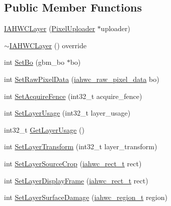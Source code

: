 \subsection*{Public Member Functions}
\begin{DoxyCompactItemize}
\item 
\mbox{\hyperlink{classhwcomposer_1_1IAHWC_1_1IAHWCLayer_ae122add62cc7f3cd678c50e496d4c47a}{I\+A\+H\+W\+C\+Layer}} (\mbox{\hyperlink{classhwcomposer_1_1PixelUploader}{Pixel\+Uploader}} $\ast$uploader)
\item 
\mbox{\hyperlink{classhwcomposer_1_1IAHWC_1_1IAHWCLayer_a2892f299cd177f11eb74df9395c8a4aa}{$\sim$\+I\+A\+H\+W\+C\+Layer}} () override
\item 
int \mbox{\hyperlink{classhwcomposer_1_1IAHWC_1_1IAHWCLayer_afedbf8d41373ce7db62460a2da85aeb8}{Set\+Bo}} (gbm\+\_\+bo $\ast$bo)
\item 
int \mbox{\hyperlink{classhwcomposer_1_1IAHWC_1_1IAHWCLayer_a39640aa3fd041b26da6b81d05655d55d}{Set\+Raw\+Pixel\+Data}} (\mbox{\hyperlink{structiahwc__raw__pixel__data}{iahwc\+\_\+raw\+\_\+pixel\+\_\+data}} bo)
\item 
int \mbox{\hyperlink{classhwcomposer_1_1IAHWC_1_1IAHWCLayer_a8837b3203e3146661dc4b4945ec718aa}{Set\+Acquire\+Fence}} (int32\+\_\+t acquire\+\_\+fence)
\item 
int \mbox{\hyperlink{classhwcomposer_1_1IAHWC_1_1IAHWCLayer_ace10db167a3829db79ed6f8c58dcd835}{Set\+Layer\+Usage}} (int32\+\_\+t layer\+\_\+usage)
\item 
int32\+\_\+t \mbox{\hyperlink{classhwcomposer_1_1IAHWC_1_1IAHWCLayer_a6783dc674ff0be10fefab1dd1380e03e}{Get\+Layer\+Usage}} ()
\item 
int \mbox{\hyperlink{classhwcomposer_1_1IAHWC_1_1IAHWCLayer_a35664e00f7b1bb14da7069e28d088ddc}{Set\+Layer\+Transform}} (int32\+\_\+t layer\+\_\+transform)
\item 
int \mbox{\hyperlink{classhwcomposer_1_1IAHWC_1_1IAHWCLayer_a40436b42ea0e7252a27a8c025461ec56}{Set\+Layer\+Source\+Crop}} (\mbox{\hyperlink{iahwc_8h_a163ae45b2470c0d300fe4ec4d017a603}{iahwc\+\_\+rect\+\_\+t}} rect)
\item 
int \mbox{\hyperlink{classhwcomposer_1_1IAHWC_1_1IAHWCLayer_aa8077a3f1267b477a2b1a5ee62e55220}{Set\+Layer\+Display\+Frame}} (\mbox{\hyperlink{iahwc_8h_a163ae45b2470c0d300fe4ec4d017a603}{iahwc\+\_\+rect\+\_\+t}} rect)
\item 
int \mbox{\hyperlink{classhwcomposer_1_1IAHWC_1_1IAHWCLayer_ad06ed34aff071b07ba4afa8e00fc5e34}{Set\+Layer\+Surface\+Damage}} (\mbox{\hyperlink{iahwc_8h_a465287f127b987e53fe91592c12eed43}{iahwc\+\_\+region\+\_\+t}} region)

\end{DoxyCompactItemize}
